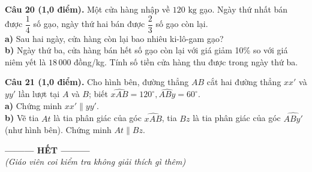 \documentclass[10.5pt,a4paper]{article}
\begin{document}
\vspace{1mm}
\noindent\textbf{Câu 20 (1,0 điểm).} Một cửa hàng nhập về $120\text{ kg}$ gạo. Ngày thứ nhất bán được $\dfrac{1}{4}$ số gạo, ngày thứ hai bán được $\dfrac{2}{3}$ số gạo còn lại.\\
\textbf{a)} Sau hai ngày, cửa hàng còn lại bao nhiêu ki-lô-gam gạo?\\
\textbf{b)} Ngày thứ ba, cửa hàng bán hết số gạo còn lại với giá giảm 10\% so với giá niêm yết là $18\,000$ đồng/kg. Tính số tiền cửa hàng thu được trong ngày thứ ba.

\vspace{1mm}
\noindent
\begin{minipage}[m]{0.64\linewidth}
\textbf{Câu 21 (1,0 điểm).} Cho hình bên, đường thẳng $AB$ cắt hai đường thẳng $xx'$ và $yy'$ lần lượt tại $A$ và $B$; biết $\widehat{xAB} = 120^\circ, \widehat{ABy} = 60^\circ$.\\
\textbf{a)} Chứng minh $xx' \parallel yy'$.\\
\textbf{b)} Vẽ tia $At$ là tia phân giác của góc $\widehat{xAB}$, tia $Bz$ là tia phân giác của góc $\widehat{ABy'}$ (như hình bên). Chứng minh $At \parallel Bz$.
\end{minipage}
\hfill
\begin{minipage}[m]{0.34\linewidth}
\centering
{}
\end{minipage}

\vfill
\begin{center}
\textbf{--------- HẾT ---------}\\
\textit{(Giáo viên coi kiểm tra không giải thích gì thêm)}
\end{center}
\end{document}
